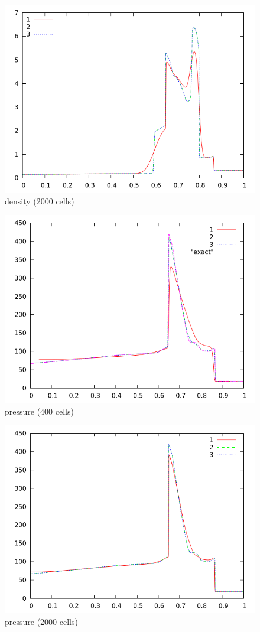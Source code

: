 \documentclass[letterpaper,12pt]{article}
\begin{document}
\begin{figure}[h]
  \begin{center}
     \includegraphics[width=.78\textwidth]{den_T12_2000.png}	
  \end{center}
  \caption{density (2000 cells)}
\end{figure}

\begin{figure}[h]
  \begin{center}
     \includegraphics[width=.78\textwidth]{prs_T12_400.png}	
  \end{center}
  \caption{pressure (400 cells)}
\end{figure}

\begin{figure}[h]
  \begin{center}
     \includegraphics[width=.78\textwidth]{prs_T12_2000.png}	
  \end{center}
  \caption{pressure (2000 cells)}
\end{figure}
\end{document}
